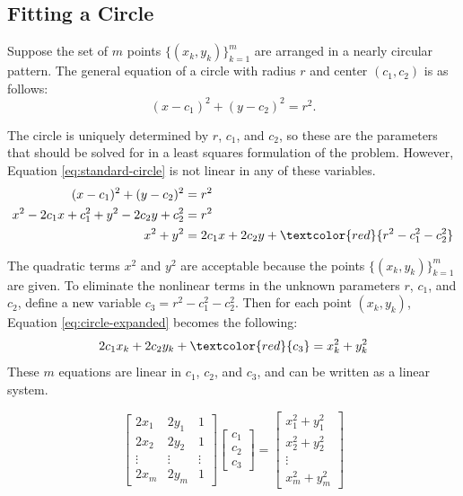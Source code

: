 \subsection*{Fitting a Circle} %

Suppose the set of $m$ points $\{(x_k, y_k)\}_{k=1}^m$ are arranged in a nearly circular pattern.
The general equation of a circle with radius $r$ and center $(c_1, c_2)$ is as follows:
\begin{equation}
(x-c_1)^2 + (y-c_2)^2 = r^2.
\label{eq:standard-circle}
\end{equation}

The circle is uniquely determined  by $r$, $c_1$, and $c_2$, so these are the parameters that should be solved for in a least squares formulation of the problem.
However, Equation \ref{eq:standard-circle} is not linear in any of these variables.
%
\begin{align}
\nonumber (x - c_1)^2 + (y - c_2)^2 &= r^2 \\
\nonumber x^2 - 2c_1 x + c_1^2 + y^2 - 2c_2y + c_2^2 &= r^2 \\
x^2 + y^2 & = 2c_1 x + 2c_2 y + \textcolor{red}{r^2 - c_1^2 - c_2^2}
\label{eq:circle-expanded}
\end{align}

The quadratic terms $x^2$ and $y^2$ are acceptable because the points $\{(x_k, y_k)\}_{k=1}^m$ are given.
To eliminate the nonlinear terms in the unknown parameters $r$, $c_1$, and $c_2$, define a new variable $c_3 = r^2 - c_1^2 - c_2^2$.
Then for each point $(x_k, y_k)$, Equation \ref{eq:circle-expanded} becomes the following:
\[2c_1x_k + 2c_2y_k + \textcolor{red}{c_3} = x_k^2 + y_k^2\]
These $m$ equations are linear in $c_1$, $c_2$, and $c_3$, and can be written as a linear system.

\begin{equation}
\left[\begin{array}{ccc}
2 x_1 & 2 y_1 & 1 \\
2 x_2 & 2 y_2 & 1 \\
\vdots & \vdots & \vdots \\
2 x_m & 2 y_m & 1
\end{array}\right]
\left[\begin{array}{c} c_1 \\ c_2 \\ c_3 \end{array}\right]
=
\left[\begin{array}{c}
x_1^2 + y_1^2 \\
x_2^2 + y_2^2 \\
\vdots \\
x_m^2 + y_m^2
\end{array}\right]
\label{eq:circle-least-squares}
\end{equation}

